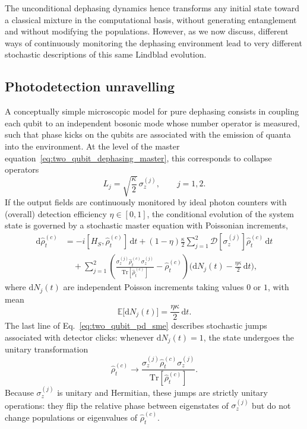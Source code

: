 The unconditional dephasing dynamics hence transforms any initial state toward a classical mixture in the computational basis, without generating entanglement and without modifying the populations.  
However, as we now discuss, different ways of continuously monitoring the dephasing environment lead to very different stochastic descriptions of this same Lindblad evolution.

\subsection{Photodetection unravelling}
\label{subsec:two_qubit_pd}

A conceptually simple microscopic model for pure dephasing consists in coupling each qubit to an independent bosonic mode whose number operator is measured, such that phase kicks on the qubits are associated with the emission of quanta into the environment.  
At the level of the master equation~\eqref{eq:two_qubit_dephasing_master}, this corresponds to collapse operators
\begin{equation}
	L_j = \sqrt{\frac{\kappa}{2}}\, \sigma_z^{(j)},
	\qquad j = 1,2.
\end{equation}
If the output fields are continuously monitored by ideal photon counters with (overall) detection efficiency $\eta \in [0,1]$, the conditional evolution of the system state is governed by a stochastic master equation with Poissonian increments,
\begin{equation}
	\begin{aligned}
		\mathrm{d}\hat{\rho}_t^{(c)}
		&= - i [H_S, \hat{\rho}_t^{(c)}]\, \mathrm{d}t
		+ (1-\eta)\frac{\kappa}{2}\sum_{j=1}^{2} 
		\mathcal{D}[\sigma_z^{(j)}]\hat{\rho}_t^{(c)} \,\mathrm{d}t \\
		&\quad + \sum_{j=1}^{2}
		\left(
		\frac{\sigma_z^{(j)} \hat{\rho}_t^{(c)} \sigma_z^{(j)}}
		{\mathrm{Tr}[\hat{\rho}_t^{(c)}]}
		- \hat{\rho}_t^{(c)}
		\right)
		\bigl(\mathrm{d}N_j(t) - \tfrac{\eta\kappa}{2} \,\mathrm{d}t \bigr),
	\end{aligned}
	\label{eq:two_qubit_pd_sme}
\end{equation}
where $\mathrm{d}N_j(t)$ are independent Poisson increments taking values $0$ or $1$, with mean
\begin{equation}
	\mathbb{E}\bigl[\mathrm{d}N_j(t)\bigr] = \frac{\eta\kappa}{2}\, \mathrm{d}t.
\end{equation}
The last line of Eq.~\eqref{eq:two_qubit_pd_sme} describes stochastic jumps associated with detector clicks: whenever $\mathrm{d}N_j(t)=1$, the state undergoes the unitary transformation
\begin{equation}
	\hat{\rho}_t^{(c)} \longrightarrow
	\frac{\sigma_z^{(j)} \hat{\rho}_t^{(c)} \sigma_z^{(j)}}
	{\mathrm{Tr}[\hat{\rho}_t^{(c)}]}.
\end{equation}
Because $\sigma_z^{(j)}$ is unitary and Hermitian, these jumps are strictly unitary operations: they flip the relative phase between eigenstates of $\sigma_z^{(j)}$ but do not change populations or eigenvalues of $\hat{\rho}_t^{(c)}$.

